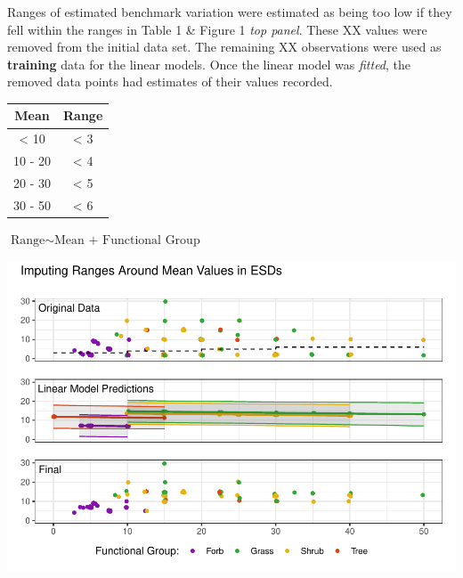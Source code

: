 \documentclass[
]{article}
\begin{document}
Ranges of estimated benchmark variation were estimated as being too low
if they fell within the ranges in Table 1 \& Figure 1 \emph{top panel}.
These XX values were removed from the initial data set. The remaining XX
observations were used as \textbf{training} data for the linear models.
Once the linear model was \emph{fitted}, the removed data points had
estimates of their values recorded.

\begin{longtable}[]{@{}cc@{}}
\toprule()
Mean & Range \\
\midrule()
\endhead
\textless{} 10 & \textless{} 3 \\
10 - 20 & \textless{} 4 \\
20 - 30 & \textless{} 5 \\
30 - 50 & \textless{} 6 \\
\bottomrule()
\end{longtable}

\(\text{Range} \sim \text{Mean + Functional Group}\)

\includegraphics{increase_range_around_narrow_means_files/figure-latex/unnamed-chunk-1-1.pdf}
\end{document}
